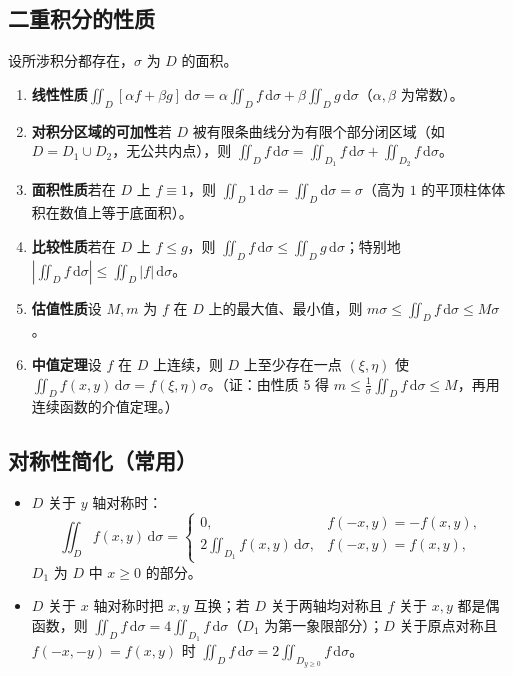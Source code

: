 \subsection{二重积分的性质}

设所涉积分都存在，$\sigma$ 为 $D$ 的面积。

\begin{enumerate}
  \item \textbf{线性性质}\quad $\iint_D[\alpha f+\beta g]\,\mathrm{d}\sigma=\alpha\iint_Df\,\mathrm{d}\sigma+\beta\iint_Dg\,\mathrm{d}\sigma$（$\alpha,\beta$ 为常数）。
  \item \textbf{对积分区域的可加性}\quad 若 $D$ 被有限条曲线分为有限个部分闭区域（如 $D=D_1\cup D_2$，无公共内点），则 $\iint_Df\,\mathrm{d}\sigma=\iint_{D_1}f\,\mathrm{d}\sigma+\iint_{D_2}f\,\mathrm{d}\sigma$。
  \item \textbf{面积性质}\quad 若在 $D$ 上 $f\equiv1$，则 $\iint_D1\,\mathrm{d}\sigma=\iint_D\mathrm{d}\sigma=\sigma$（高为 $1$ 的平顶柱体体积在数值上等于底面积）。
  \item \textbf{比较性质}\quad 若在 $D$ 上 $f\le g$，则 $\iint_Df\,\mathrm{d}\sigma\le\iint_Dg\,\mathrm{d}\sigma$；特别地 $\left|\iint_Df\,\mathrm{d}\sigma\right|\le\iint_D|f|\,\mathrm{d}\sigma$。
  \item \textbf{估值性质}\quad 设 $M,m$ 为 $f$ 在 $D$ 上的最大值、最小值，则 $m\sigma\le\iint_Df\,\mathrm{d}\sigma\le M\sigma$。
  \item \textbf{中值定理}\quad 设 $f$ 在 $D$ 上连续，则 $D$ 上至少存在一点 $(\xi,\eta)$ 使 $\iint_Df(x,y)\,\mathrm{d}\sigma=f(\xi,\eta)\sigma$。（证：由性质 5 得 $m\le\frac{1}{\sigma}\iint_Df\,\mathrm{d}\sigma\le M$，再用连续函数的介值定理。）
\end{enumerate}


\subsection{对称性简化（常用）}

\begin{itemize}
  \item $D$ 关于 $y$ 轴对称时：
  \[
  \iint_Df(x,y)\,\mathrm{d}\sigma=
  \begin{cases}
  0, & f(-x,y)=-f(x,y),\\[2pt]
  2\displaystyle\iint_{D_1}f(x,y)\,\mathrm{d}\sigma, & f(-x,y)=f(x,y),
  \end{cases}
  \]
  $D_1$ 为 $D$ 中 $x\ge0$ 的部分。
  \item $D$ 关于 $x$ 轴对称时把 $x,y$ 互换；若 $D$ 关于两轴均对称且 $f$ 关于 $x,y$ 都是偶函数，则 $\iint_Df\,\mathrm{d}\sigma=4\iint_{D_1}f\,\mathrm{d}\sigma$（$D_1$ 为第一象限部分）；$D$ 关于原点对称且 $f(-x,-y)=f(x,y)$ 时 $\iint_Df\,\mathrm{d}\sigma=2\iint_{D_{y\ge0}}f\,\mathrm{d}\sigma$。
\end{itemize}

